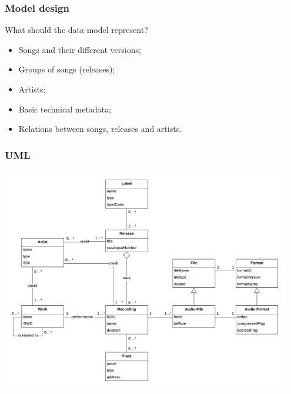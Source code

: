 \documentclass{beamer}
\begin{document}
  \begin{frame}
    \frametitle{Model design}

    What should the data model represent?

    \vspace{1em}

    \begin{itemize}
      \itemsep0.75em
      \item Songs and their different versions;
      \item Groups of songs (releases);
      \item Artists;
      \item Basic technical metadata;
      \item Relations between songs, releases and artists.
    \end{itemize}

  \end{frame}



  \begin{frame}
    \frametitle{UML}
    \begin{center}
      \includegraphics[width=0.95\textwidth]{img/UML.pdf}
    \end{center}
  \end{frame}
\end{document}
